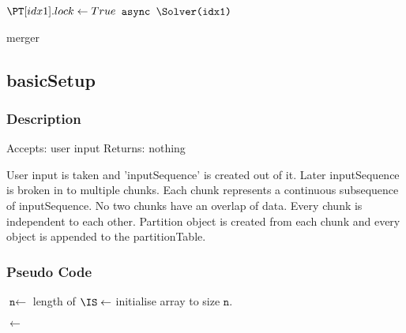\documentclass{article}
\begin{document}
\begin{flushleft}
\begin{algorithm}
 {
	$ \PT[idx1].lock \leftarrow True $ \;
	$ \texttt{async \Solver(idx1)} $ \;
}

\caption{merger}\label{algo_merger}
\end{algorithm}\DecMargin{3em}

\newpage

\subsection{basicSetup}

\subsubsection*{Description}

Accepts: user input \BlankLine
Returns: nothing \BlankLine

User input is taken and 'inputSequence' is created out of it. Later inputSequence is broken in to multiple chunks. Each chunk represents a continuous subsequence of inputSequence. No two chunks have an overlap of data. Every chunk is independent to each other. Partition object is created from each chunk and every object is appended to the partitionTable.

\subsubsection*{Pseudo Code}

\IncMargin{1em}
\begin{algorithm}




\BlankLine

$\texttt{n} \leftarrow$ length of  \UI\;
$\IS \leftarrow$ initialise array to size $\texttt{n}$.

\BL $\leftarrow$ \;  


\end{algorithm}
\end{flushleft}
\end{document}
